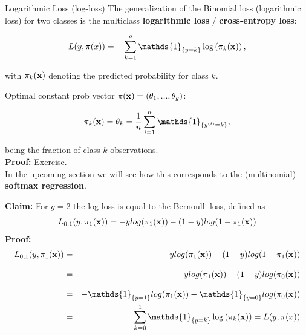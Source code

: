 \documentclass[11pt,compress,t,notes=noshow, xcolor=table]{beamer}
\begin{document}
\begin{vbframe}{Logarithmic Loss (log-loss)}
The generalization of the Binomial loss (logarithmic loss) for two classes is the multiclass \textbf{logarithmic loss} / \textbf{cross-entropy loss}:

\vspace*{-0.2cm}
\begin{footnotesize}
$$
  L(y, \pi(x)) = - \sum_{k = 1}^g \mathds{1}_{\{y = k\}} \log\left(\pi_k(\xv)\right),
$$
\end{footnotesize}
with $\pi_k(\mathbf{x})$ denoting the predicted probability for class $k$.

\vspace*{0.2cm}
 
Optimal constant prob vector $\pi(\mathbf{x}) = \left(\theta_1, ..., \theta_g\right)$: 
\begin{footnotesize}
$$
    \pikx = \theta_k = \frac{1}{n} \sumin \mathds{1}_{\{\yi = k\}},   
$$
\end{footnotesize}
 being the fraction of class-$k$ observations. \\
\vspace*{0.5cm}
\textbf{Proof:} Exercise. \\
\vspace*{0.5cm}
In the upcoming section we will see how this corresponds to the (multinomial) \textbf{softmax regression}. 

\framebreak
\textbf{Claim:} For $g = 2$ the log-loss is equal to the Bernoulli loss, defined as
$$L_{0, 1}(y, \pi_1(\mathbf{x})) = -ylog(\pi_1(\mathbf{x})) - (1- y) log(1- \pi_1(\mathbf{x}))$$
\textbf{Proof:}
\begin{eqnarray*}
L_{0, 1}(y, \pi_1(\xv)) &=& -ylog(\pi_1(\xv)) - (1- y) log(1- \pi_1(\xv))\\[0.3cm]
&=& -ylog(\pi_1(\xv)) - (1- y) log(\pi_0(\xv))\\[0.3cm]
&=& -\mathds{1}_{\{y = 1\}} log(\pi_1(\xv)) - \mathds{1}_{\{y = 0\}} log(\pi_0(\xv))\\
&=& - \sum_{k = 0}^1 \mathds{1}_{\{y = k\}} \log\left(\pi_k(\xv)\right) = L(y, \pi(x))
\end{eqnarray*}
\end{vbframe}

\endlecture
\end{document}
